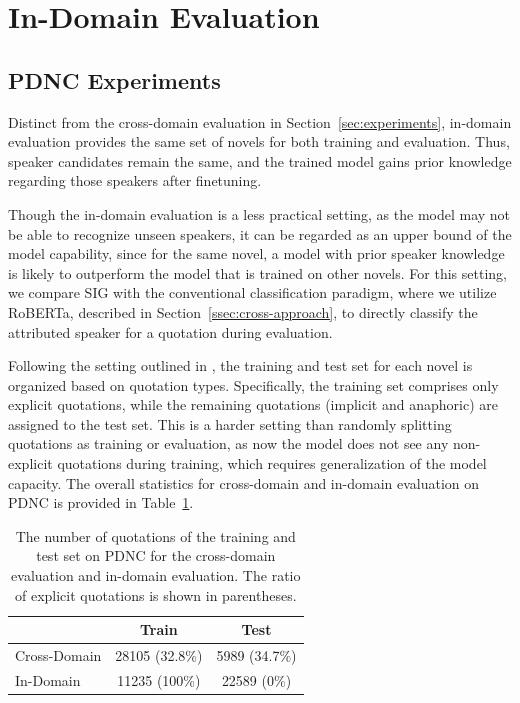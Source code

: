 \documentclass[letterpaper]{article} %
\begin{document}
\section{In-Domain Evaluation}



\subsection{PDNC Experiments}
Distinct from the cross-domain evaluation in Section~\ref{sec:experiments}, in-domain evaluation provides the same set of novels for both training and evaluation. Thus, speaker candidates remain the same, and the trained model gains prior knowledge regarding those speakers after finetuning.

Though the in-domain evaluation is a less practical setting, as the model may not be able to recognize unseen speakers, it can be regarded as an upper bound of the model capability, since for the same novel, a model with prior speaker knowledge is likely to outperform the model that is trained on other novels.
For this setting, we compare SIG with the conventional classification paradigm, where we utilize RoBERTa, described in Section~\ref{ssec:cross-approach}, to directly classify the attributed speaker for a quotation during evaluation.

Following the setting outlined in \citep{DBLP:conf/lrec/VishnubhotlaHH22}, the training and test set for each novel is organized based on quotation types. Specifically, the training set comprises only explicit quotations, while the remaining quotations (implicit and anaphoric) are assigned to the test set. This is a harder setting than randomly splitting quotations as training or evaluation, as now the model does not see any non-explicit quotations during training, which requires generalization of the model capacity. The overall statistics for cross-domain and in-domain evaluation on PDNC is provided in Table~\ref{tab:stats}.

\begin{table}[htbp!]
    \centering
    \begin{tabular}{l|cc}
       \toprule
       & \textbf{Train} &\textbf{Test}\\
       \midrule
       Cross-Domain & 28105 (32.8\%) & 5989 (34.7\%) \\
       In-Domain & 11235 (100\%) & 22589 (0\%) \\
       \bottomrule
    \end{tabular}
    \caption{The number of quotations of the training and test set on PDNC for the cross-domain evaluation and in-domain evaluation. The ratio of explicit quotations is shown in parentheses.}
    \label{tab:stats}
\end{table}
\end{document}
